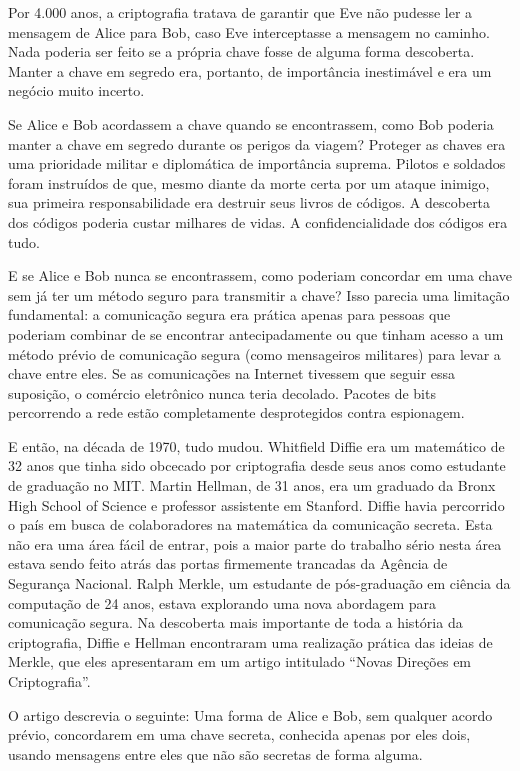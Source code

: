 \documentclass{book}
\begin{document}
Por 4.000 anos, a criptografia tratava de garantir que Eve não pudesse ler a mensagem de Alice para Bob, caso Eve interceptasse a mensagem no caminho. Nada poderia ser feito se a própria chave fosse de alguma forma descoberta. Manter a chave em segredo era, portanto, de importância inestimável e era um negócio muito incerto.

Se Alice e Bob acordassem a chave quando se encontrassem, como Bob poderia manter a chave em segredo durante os perigos da viagem? Proteger as chaves era uma prioridade militar e diplomática de importância suprema. Pilotos e soldados foram instruídos de que, mesmo diante da morte certa por um ataque inimigo, sua primeira responsabilidade era destruir seus livros de códigos. A descoberta dos códigos poderia custar milhares de vidas. A confidencialidade dos códigos era tudo.

E se Alice e Bob nunca se encontrassem, como poderiam concordar em uma chave sem já ter um método seguro para transmitir a chave? Isso parecia uma limitação fundamental: a comunicação segura era prática apenas para pessoas que poderiam combinar de se encontrar antecipadamente ou que tinham acesso a um método prévio de comunicação segura (como mensageiros militares) para levar a chave entre eles. Se as comunicações na Internet tivessem que seguir essa suposição, o comércio eletrônico nunca teria decolado. Pacotes de bits percorrendo a rede estão completamente desprotegidos contra espionagem.

E então, na década de 1970, tudo mudou. Whitfield Diffie era um matemático de 32 anos que tinha sido obcecado por criptografia desde seus anos como estudante de graduação no MIT. Martin Hellman, de 31 anos, era um graduado da Bronx High School of Science e professor assistente em Stanford. Diffie havia percorrido o país em busca de colaboradores na matemática da comunicação secreta. Esta não era uma área fácil de entrar, pois a maior parte do trabalho sério nesta área estava sendo feito atrás das portas firmemente trancadas da Agência de Segurança Nacional. Ralph Merkle, um estudante de pós-graduação em ciência da computação de 24 anos, estava explorando uma nova abordagem para comunicação segura. Na descoberta mais importante de toda a história da criptografia, Diffie e Hellman encontraram uma realização prática das ideias de Merkle, que eles apresentaram em um artigo intitulado ``Novas Direções em Criptografia''.

O artigo descrevia o seguinte: Uma forma de Alice e Bob, sem qualquer acordo prévio, concordarem em uma chave secreta, conhecida apenas por eles dois, usando mensagens entre eles que não são secretas de forma alguma.
\end{document}
